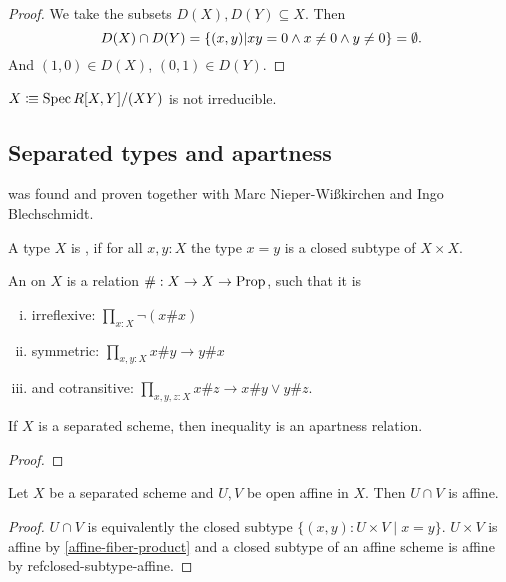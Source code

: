 \begin{proof}
  We take the subsets $D(X),D(Y)\subseteq X$.
  Then
  \[ D(X)\cap D(Y)=\{(x,y)\vert xy=0\wedge x\neq 0\wedge y\neq 0\}=\emptyset\rlap{.} \]
  And $(1,0)\in D(X)$, $(0,1)\in D(Y)$.
\end{proof}

\begin{example}
  $X\vcentcolon\mspace{-1.2mu}\equiv \operatorname{Spec} R[X,Y]/(XY)$ is not irreducible.
\end{example}

\subsection{Separated types and apartness}

 was found and proven together with Marc Nieper-Wißkirchen and Ingo Blechschmidt.

\begin{definition}%
  A type $X$ is , if for all $x,y:X$
  the type $x=y$ is a closed subtype of $X\times X$.
\end{definition}

\begin{definition}
  An  on $X$ is a relation $\#:X\to X\to \mathrm{Prop}$, such that it is
  \begin{enumerate}[(i)]
  \item irreflexive: $\prod_{x:X}\neg(x \# x)$
  \item symmetric: $\prod_{x,y:X} x\# y \to y\# x$
  \item and cotransitive: $\prod_{x,y,z:X} x\# z \to x\# y \vee y\# z$.
  \end{enumerate}
\end{definition}

\begin{proposition}%
  \label{separated-inequality-apartness}
  If $X$ is a separated scheme, then inequality is an apartness relation.
\end{proposition}

\begin{proof}

\end{proof}

\begin{proposition}%
  Let $X$ be a separated scheme and $U,V$ be open affine in $X$.
  Then $U\cap V$ is affine.
\end{proposition}

\begin{proof}
  $U\cap V$ is equivalently the closed subtype $\{(x,y) : U\times V\mid x=y\}$.
  $U\times V$ is affine by \cref{affine-fiber-product} and a closed subtype of an affine scheme is affine by \¢ref{closed-subtype-affine}.
\end{proof}